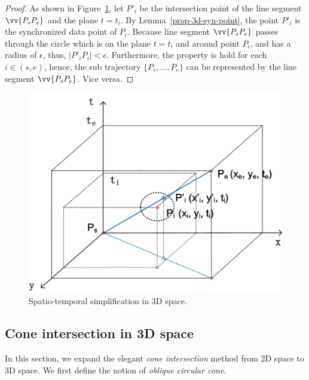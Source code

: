 \begin{proof}
As shown in Figure~\ref{fig:sed3d}, let $P'_i$ be the intersection point of the line segment $\vv{P_sP_e}$ and the plane $t=t_i$.
By Lemma~\ref{prop-3d-syn-point}, the point $P'_i$ is the synchronized data point of $P_i$.
Because line segment $\vv{P_sP_e}$ passes through the circle which is on the plane $t=t_i$ and around point $P_i$, and has a radius of $\epsilon$, thus, $|P'_iP_i| <\epsilon$. Furthermore, the property is hold for each $i \in (s, e)$, hence, the sub trajectory $\{P_s, \ldots, P_e\}$ can be represented by the line segment $\vv{P_sP_e}$.
Vice versa.
\end{proof}


\begin{figure}[tb!]
\centering
\includegraphics[scale=0.5]{figures/Fig-SEDin3D.png}
\vspace{-1ex}
\caption{\small Spatio-temporal simplification in 3D space. }
\vspace{-2ex}
\label{fig:sed3d}
\end{figure}



\subsection{Cone intersection in 3D space}

In this section, we expand the elegant \emph{cone intersection} method from 2D space to 3D space.
We first define the notion of \emph{oblique circular cone}.

